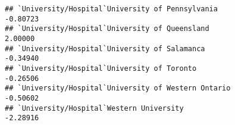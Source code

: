 \documentclass[]{article}
\begin{document}
\begin{verbatim}
## `University/Hospital`University of Pennsylvania                                                                                                                                                                                                                                                                                                                                                                                                                                 -0.80723
## `University/Hospital`University of Queensland                                                                                                                                                                                                                                                                                                                                                                                                                                    2.00000
## `University/Hospital`University of Salamanca                                                                                                                                                                                                                                                                                                                                                                                                                                    -0.34940
## `University/Hospital`University of Toronto                                                                                                                                                                                                                                                                                                                                                                                                                                      -0.26506
## `University/Hospital`University of Western Ontario                                                                                                                                                                                                                                                                                                                                                                                                                              -0.50602
## `University/Hospital`Western University                                                                                                                                                                                                                                                                                                                                                                                                                                         -2.28916

\end{verbatim}
\end{document}
